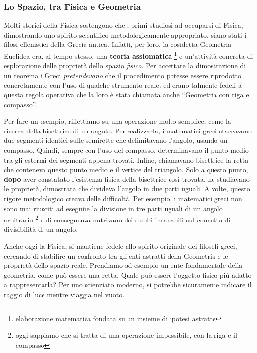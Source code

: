 \subsubsection*{Lo Spazio, tra Fisica e Geometria}

Molti storici della Fisica sostengono che i primi studiosi ad occuparsi di Fisica, dimostrando uno spirito scientifico metodologicamente appropriato, siano stati i filosi ellenistici della Grecia antica.
Infatti, per loro, la cosidetta Geometria Euclidea era, al tempo stesso, una {\bfseries teoria assiomatica} \footnote{elaborazione matematica fondata su un insieme di ipotesi astratte} e un'attività concreta di esplorazione delle proprietà dello spazio {\slshape fisico}. Per accettare la dimostrazione di un teorema i Greci {\slshape pretendevano} che il procedimento potesse essere riprodotto concretamente con l'uso di qualche strumento reale, ed erano talmente fedeli a questa regola operativa che la loro è stata chiamata anche ``Geometria con riga e compasso''. 
\newline

Per fare un esempio, riflettiamo su una operazione molto semplice, come la ricerca della bisettrice di un angolo. Per realizzarla, i matematici greci staccavano due segmenti identici sulle semirette che delimitavano l'angolo, usando un compasso. Quindi, sempre con l'uso del compasso, determinavano il punto medio tra gli estermi dei segmenti appena trovati. Infine, chiamavano bisettrice la retta che conteneva questo punto medio e il vertice del triangolo. Solo a questo punto, {\bfseries dopo} aver constatato l'esistenza fisica della bisettrice così trovata, ne studiavano le proprietà, dimostrata che divideva l'angolo in due parti uguali.\newline
A volte, questo rigore metodologico creava delle difficoltà. Per esempio, i matematici greci non sono mai riusciti ad eseguire la divisione in tre parti uguali di un angolo arbitrario \footnote{oggi sappiamo che si tratta di una operazione impossibile, con la riga e il compasso} e di conseguenza nutrivano dei dubbi insanabili sul concetto di divisibilità di un angolo.
\newline

Anche oggi la Fisica, si mantiene fedele allo spirito originale dei filosofi greci, cercando di stabilire un confronto tra gli enti astratti della Geometria e le proprietà dello spazio reale.\newline
Prendiamo ad esempio un ente fondamentale della geometria, come può essere una retta.
Quale può essere l'oggetto fisico più adatto a rappresentarla? Per uno scienziato moderno, si potrebbe sicuramente indicare il raggio di luce mentre viaggia nel vuoto.
\newline

